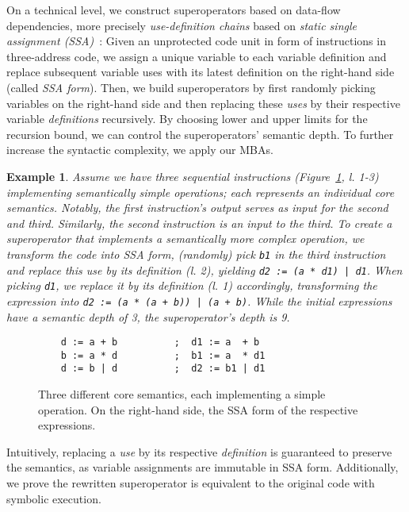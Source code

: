 \documentclass[letterpaper,twocolumn,10pt]{article}
\theoremstyle{customexample}
\newtheorem{example}{Example}
\theoremstyle{customexperiment}
\begin{document}
On a technical level, we construct superoperators based on data-flow dependencies, more precisely \textit{use-definition chains} based on \emph{static single assignment (SSA)}~\cite{cytron1989ssa}: 
Given an unprotected code unit in form of instructions in three-address code, we assign a unique variable to each variable definition and replace subsequent variable uses with its latest definition on the right-hand side (called \emph{SSA form}). Then, we build superoperators by first randomly picking variables on the right-hand side and then replacing these \emph{uses} by their respective variable \emph{definitions} recursively. By choosing lower and upper limits for the recursion bound, we can control the superoperators' semantic depth. To further increase the syntactic complexity, we apply our MBAs.



\begin{example}
Assume we have three sequential instructions (Figure~\ref{fig:sueroperator_snippet}, l. 1-3) implementing semantically simple operations; each represents an individual core semantics. 
Notably, the first instruction's output serves as input for the second and third. Similarly, the second instruction is an input to the third.
To create a superoperator that implements a semantically more complex operation, we transform the code into SSA form, (randomly) pick \texttt{b1} in the third instruction and replace this use by its definition (l. 2), yielding \texttt{d2 := (a * d1) | d1}.  
When picking \texttt{d1}, we replace it by its definition (l. 1) accordingly, transforming the expression into \texttt{d2 := (a * (a + b)) | (a + b)}. While the initial expressions have a semantic depth of 3, the superoperator's depth is 9.
\end{example}

\begin{figure}[tp]
\begin{verbatim}
    d := a + b          ;  d1 := a  + b
    b := a * d          ;  b1 := a  * d1
    d := b | d          ;  d2 := b1 | d1
\end{verbatim}
\caption{Three different core semantics, each implementing a simple operation. On the right-hand side, the SSA form of the respective expressions.}\label{fig:sueroperator_snippet}\vspace{-1.5em}
\end{figure}

Intuitively, replacing a \emph{use} by its respective \emph{definition} is guaranteed to preserve the semantics, as variable assignments are immutable in SSA form. 
Additionally, we prove the rewritten superoperator is equivalent to the original code with symbolic execution.
\end{document}
